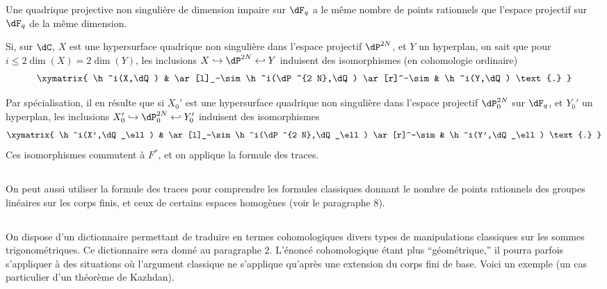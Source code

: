 Une quadrique projective non singulière de dimension impaire sur \texorpdfstring{$\dF_q$}{Fq} a le même nombre de points rationnels que l'espace projectif sur \texorpdfstring{$\dF_q$}{Fq} de la même dimension.

Si, sur $\dC$, $X$ est une hypersurface quadrique non singulière dans 
l'espace projectif $\dP^{2 N}$, et $Y$ un hyperplan, on sait que pour 
$i\leqslant 2\dim(X)=2\dim(Y)$, les inclusions 
$X\hookrightarrow \dP^{2 N}\hookleftarrow Y$ induisent des isomorphismes (en 
cohomologie ordinaire) 
\[\xymatrix{
  \h^i(X,\dQ) 
    & \ar[l]_-\sim \h^i(\dP^{2 N},\dQ) \ar[r]^-\sim 
    & \h^i(Y,\dQ) \text{.}
}\]

Par spécialisation, il en résulte que si $X_0'$ est une hypersurface 
quadrique non singulière dans l'espace projectif $\dP_0^{2 N}$ sur $\dF_q$, 
et $Y_0'$ un hyperplan, les inclusions 
$X_0'\hookrightarrow \dP_0^{2 N}\hookleftarrow Y_0'$ induisent des 
isomorphismes 
\[\xymatrix{
  \h^i(X',\dQ_\ell) 
    & \ar[l]_-\sim \h^i(\dP^{2 N},\dQ_\ell) \ar[r]^-\sim 
    & \h^i(Y',\dQ_\ell) \text{.}
}\]
Ces isomorphismes commutent à $F^\ast$, et on applique la formule des traces. 





\subsection{}\label{VI:1-11}

On peut aussi utiliser la formule des traces pour comprendre les formules 
classiques donnant le nombre de points rationnels des groupes linéaires sur 
les corps finis, et ceux de certains espaces homogènes (voir le paragraphe 
8). 





\subsection{}\label{VI:1-12}

On dispose d'un dictionnaire permettant de traduire en termes cohomologiques 
divers types de manipulations classiques sur les sommes 
trigonométriques. Ce dictionnaire sera donné au paragraphe 2. L'énoncé 
cohomologique étant plus ``géométrique,'' il pourra parfois s'appliquer 
à des situations où l'argument classique ne s'applique qu'après une 
extension du corps fini de base. Voici un exemple (un cas particulier d'un 
théorème de Kazhdan). 





